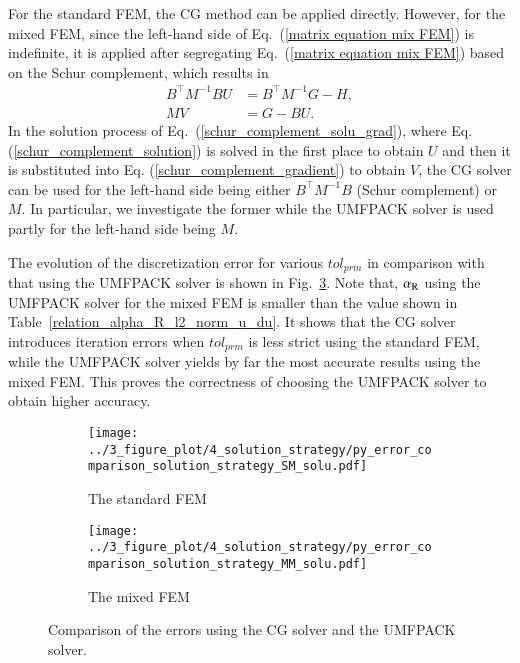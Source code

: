 \documentclass[review,3p]{elsarticle}
\begin{document}
For the standard FEM, the CG method can be applied directly. However, for the mixed FEM, since the left-hand side of Eq.~(\ref{matrix equation mix FEM}) is indefinite, it is applied after segregating Eq.~(\ref{matrix equation mix FEM}) based on the Schur complement, which results in
\begin{subequations}
 \begin{align}
  B^{\top} M^{-1} B U &= B^{\top} M^{-1} G - H, 	\label{schur_complement_solution} \\
  MV&=G-BU.						\label{schur_complement_gradient}
\end{align}						\label{schur_complement_solu_grad}%
\end{subequations}
In the solution process of Eq.~(\ref{schur_complement_solu_grad}), where Eq. (\ref{schur_complement_solution}) is solved in the first place to obtain $U$ and then it is substituted into Eq. (\ref{schur_complement_gradient}) to obtain $V$, the CG solver can be used for the left-hand side being either $B^{\top}M^{-1}B$ (Schur complement) or $M$. In particular, we investigate the former while the UMFPACK solver is used partly for the left-hand side being $M$.  

The evolution of the discretization error for various $tol_{prm}$ in comparison with that using the UMFPACK solver is shown in Fig.~\ref{py_bench_Pois_error_solution_strategy}. Note that, $\alpha_{\rm R}$ using the UMFPACK solver for the mixed FEM is smaller than the value shown in Table~\ref{relation_alpha_R_l2_norm_u_du}.
It shows that the CG solver introduces iteration errors when $tol_{prm}$ is less strict using the standard FEM, while the UMFPACK solver yields by far the most accurate results using the mixed FEM. This proves the correctness of choosing the UMFPACK solver to obtain higher accuracy. 

\begin{figure}[!ht]
	\centering
    \begin{subfigure}{5.5cm}
        \texttt{[image: ../3\_figure\_plot/4\_solution\_strategy/py\_error\_comparison\_solution\_strategy\_SM\_solu.pdf]}
        \caption{The standard FEM}
        \label{py_bench_Pois_SM_error_solution_strategy_solu}
    \end{subfigure}
    \hspace{-0.2cm}
    \begin{subfigure}{5.5cm}	                		 	
        \texttt{[image: ../3\_figure\_plot/4\_solution\_strategy/py\_error\_comparison\_solution\_strategy\_MM\_solu.pdf]}
        \caption{The mixed FEM}
        \label{py_bench_Pois_MM_error_solution_strategy_solu}
    \end{subfigure}
\caption{Comparison of the errors using the CG solver and the UMFPACK solver.}
\label{py_bench_Pois_error_solution_strategy}
\end{figure}
\end{document}
